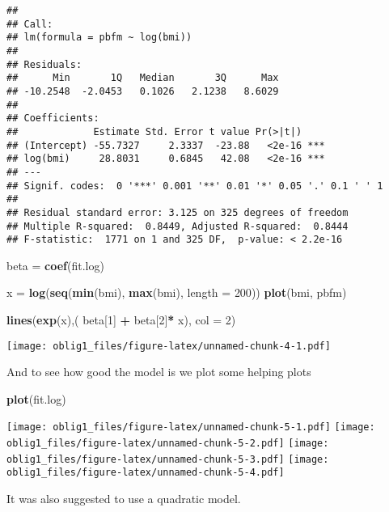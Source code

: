\documentclass[
]{article}
\newenvironment{Shaded}{\begin{snugshade}}{\end{snugshade}}
\newcommand{\DataTypeTok}[1]{\textcolor[rgb]{0.13,0.29,0.53}{#1}}
\newcommand{\DecValTok}[1]{\textcolor[rgb]{0.00,0.00,0.81}{#1}}
\newcommand{\KeywordTok}[1]{\textcolor[rgb]{0.13,0.29,0.53}{\textbf{#1}}}
\newcommand{\NormalTok}[1]{#1}
\newcommand{\OperatorTok}[1]{\textcolor[rgb]{0.81,0.36,0.00}{\textbf{#1}}}
\newcommand{\StringTok}[1]{\textcolor[rgb]{0.31,0.60,0.02}{#1}}
\begin{document}
\begin{verbatim}
## 
## Call:
## lm(formula = pbfm ~ log(bmi))
## 
## Residuals:
##      Min       1Q   Median       3Q      Max 
## -10.2548  -2.0453   0.1026   2.1238   8.6029 
## 
## Coefficients:
##             Estimate Std. Error t value Pr(>|t|)    
## (Intercept) -55.7327     2.3337  -23.88   <2e-16 ***
## log(bmi)     28.8031     0.6845   42.08   <2e-16 ***
## ---
## Signif. codes:  0 '***' 0.001 '**' 0.01 '*' 0.05 '.' 0.1 ' ' 1
## 
## Residual standard error: 3.125 on 325 degrees of freedom
## Multiple R-squared:  0.8449, Adjusted R-squared:  0.8444 
## F-statistic:  1771 on 1 and 325 DF,  p-value: < 2.2e-16
\end{verbatim}

\begin{Shaded}
\begin{Highlighting}[]
\NormalTok{beta =}\StringTok{ }\KeywordTok{coef}\NormalTok{(fit.log)}

\NormalTok{x =}\StringTok{ }\KeywordTok{log}\NormalTok{(}\KeywordTok{seq}\NormalTok{(}\KeywordTok{min}\NormalTok{(bmi), }\KeywordTok{max}\NormalTok{(bmi), }\DataTypeTok{length =} \DecValTok{200}\NormalTok{))}
\KeywordTok{plot}\NormalTok{(bmi, pbfm)}

\KeywordTok{lines}\NormalTok{(}\KeywordTok{exp}\NormalTok{(x),( beta[}\DecValTok{1}\NormalTok{] }\OperatorTok{+}\StringTok{ }\NormalTok{beta[}\DecValTok{2}\NormalTok{]}\OperatorTok{*}\StringTok{ }\NormalTok{x), }\DataTypeTok{col =} \DecValTok{2}\NormalTok{) }
\end{Highlighting}
\end{Shaded}

\texttt{[image: oblig1\_files/figure-latex/unnamed-chunk-4-1.pdf]}

And to see how good the model is we plot some helping plots

\begin{Shaded}
\begin{Highlighting}[]
\KeywordTok{plot}\NormalTok{(fit.log)}
\end{Highlighting}
\end{Shaded}

\texttt{[image: oblig1\_files/figure-latex/unnamed-chunk-5-1.pdf]}
\texttt{[image: oblig1\_files/figure-latex/unnamed-chunk-5-2.pdf]}
\texttt{[image: oblig1\_files/figure-latex/unnamed-chunk-5-3.pdf]}
\texttt{[image: oblig1\_files/figure-latex/unnamed-chunk-5-4.pdf]}

It was also suggested to use a quadratic model.
\end{document}
